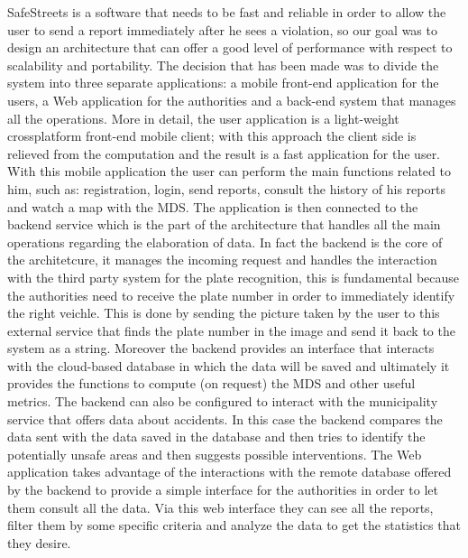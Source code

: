 SafeStreets is a software that needs to be fast and reliable in order to allow the user to send a report immediately after he sees a violation, so our goal was to design an architecture that can offer a good level of performance with respect to scalability and portability. The decision that has been made was to divide the system into three separate applications: a mobile front-end application for the users, a Web application for the authorities and a back-end system that manages all the operations. More in detail, the user application is a light-weight crossplatform front-end mobile client; with this approach the client side is relieved from the computation and the result is a fast application for the user.
With this mobile application the user can perform the main functions related to him, such as: registration, login, send reports, consult the history of his reports and watch a map with the MDS. The application is then connected to the backend service which is the part of the architecture that handles all the main operations regarding the elaboration of data. In fact the backend is the core of the architetcure, it manages the incoming request and handles the interaction with the third party system for the plate recognition, this is fundamental because the authorities need to receive the plate number in order to immediately identify the right veichle. This is done by sending the picture taken by the user to this external service that finds the plate number in the image and send it back to the system as a string. Moreover the backend provides an interface that interacts with the cloud-based database in which the data will be saved and ultimately it provides the functions to compute (on request) the MDS and other useful metrics. The backend can also be configured to interact with the municipality service that offers data about accidents. In this case the backend compares the data sent with the data saved in the database and then tries to identify the potentially unsafe areas and then suggests possible interventions. The Web application takes advantage of the interactions with the remote database offered by the backend to provide a simple interface for the authorities in order to let them consult all the data. Via this web interface they can see all the reports, filter them by some specific criteria and analyze the data to get the statistics that they desire.


